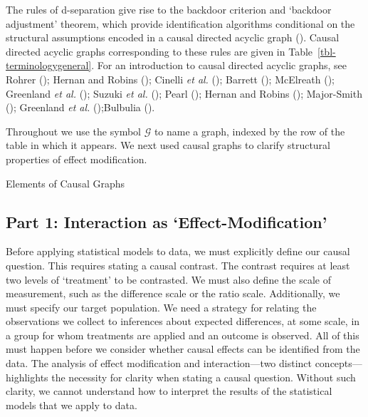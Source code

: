 \documentclass[
  single column]{article}
\begin{document}
The rules of d-separation give rise to the backdoor criterion and
`backdoor adjustment' theorem, which provide identification algorithms
conditional on the structural assumptions encoded in a causal directed
acyclic graph (). Causal directed
acyclic graphs corresponding to these rules are given in
Table~\ref{tbl-terminologygeneral}. For an introduction to causal
directed acyclic graphs, see Rohrer ();
Hernan and Robins (); Cinelli \emph{et
al.} (); Barrett
(); McElreath
(); Greenland \emph{et al.}
(); Suzuki \emph{et al.}
(); Pearl
(); Hernan and Robins
(); Major-Smith
(); Greenland \emph{et al.}
();Bulbulia
().

Throughout we use the symbol \(\mathcal{G}\) to name a graph, indexed by
the row of the table in which it appears. We next used causal graphs to
clarify structural properties of effect modification.

\begin{table}

\caption{\label{tbl-terminologygeneral}Elements of Causal Graphs}

\centering{

\terminologydirectedgraph

}

\end{table}%

\newpage{}

\subsection{Part 1: Interaction as
`Effect-Modification'}\label{id-sec-1}

Before applying statistical models to data, we must explicitly define
our causal question. This requires stating a causal contrast. The
contrast requires at least two levels of `treatment' to be contrasted.
We must also define the scale of measurement, such as the difference
scale or the ratio scale. Additionally, we must specify our target
population. We need a strategy for relating the observations we collect
to inferences about expected differences, at some scale, in a group for
whom treatments are applied and an outcome is observed. All of this must
happen before we consider whether causal effects can be identified from
the data. The analysis of effect modification and interaction---two
distinct concepts---highlights the necessity for clarity when stating a
causal question. Without such clarity, we cannot understand how to
interpret the results of the statistical models that we apply to data.
\end{document}
